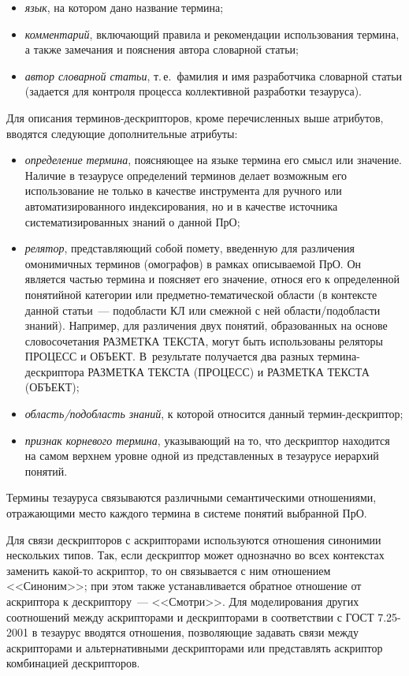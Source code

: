 \begin{multicols}{2}
\begin{itemize}
  \item \textit{язык}, на котором дано название термина;
  \item
  \textit{комментарий}, включающий правила и рекомендации использования термина, а 
также замечания и пояснения автора словарной статьи;
  \item
  \textit{автор словарной статьи}, т.\,е.\ фамилия и имя разработчика словарной статьи 
(задается для контроля процесса коллективной разработки тезауруса).
  \end{itemize}
  
  Для описания терминов-дескрипторов, кроме перечисленных выше атрибутов, вводятся 
сле\-ду\-ющие дополнительные атрибуты:
  \begin{itemize}
\item  \textit{определение термина}, поясняющее на языке термина его смысл или значение. 
Наличие в тезаурусе определений терминов делает возможным его использование не только 
в качестве инструмента для ручного или автоматизированного индексирования, но и в 
качестве источника систематизированных знаний о данной ПрО;
  \item
  \textit{релятор}, представляющий собой помету, введенную для различения омонимичных 
терминов (омографов) в рамках описываемой ПрО. Он является частью термина и поясняет 
его значение, относя его к определенной понятийной категории или предметно-тематической 
области (в контексте данной статьи~--- подобласти КЛ или смежной с ней области/подобласти 
знаний). Например, для различения двух понятий, образованных на основе словосочетания 
РАЗМЕТКА ТЕКСТА, могут быть использованы реляторы ПРОЦЕСС и ОБЪЕКТ. 
В~результате получается два разных термина-дескриптора РАЗМЕТКА ТЕКСТА 
(ПРОЦЕСС) и РАЗМЕТКА ТЕКСТА (ОБЪЕКТ);
  \item
  \textit{область/подобласть знаний}, к которой относится данный термин-дескриптор;
  \item
  \textit{признак корневого термина}, указывающий на то, что дескриптор находится на 
самом верхнем уровне одной из представленных в тезаурусе иерархий понятий.
\end{itemize}
  
  Термины тезауруса связываются различными семантическими отношениями, 
отражающими место каждого термина в системе понятий выбранной ПрО.
  
  Для связи дескрипторов с аскрипторами используются отношения синонимии нескольких 
типов. Так, если дескриптор может однозначно во всех контекстах заменить какой-то 
аскриптор, то он связывается с ним отношением <<Синоним>>; при этом также 
устанавливается обратное отношение от аскриптора к дескриптору~--- <<Смотри>>. Для 
моделирования других соотношений между аскрипторами и дескрипторами в соответствии с 
ГОСТ 7.25-2001 в тезаурус вводятся отношения, позволяющие задавать связи между 
аскрипторами и альтернативными дескрипторами или представлять аскриптор комбинацией 
дескрипторов. 
  

\end{multicols}
